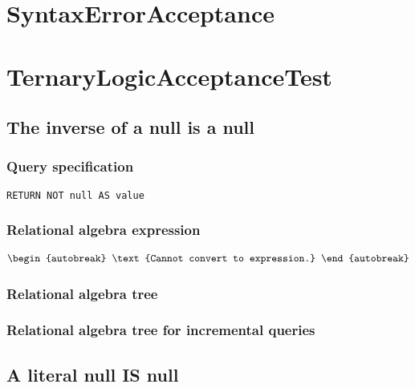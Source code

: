 \section{SyntaxErrorAcceptance}

\section{TernaryLogicAcceptanceTest}


\subsection{The inverse of a null is a null}

\subsubsection*{Query specification}

\begin{lstlisting}
RETURN NOT null AS value
\end{lstlisting}

\subsubsection*{Relational algebra expression}

\begin{align*}
\begin{autobreak}
\text{Cannot convert to expression.}
\end{autobreak}
\end{align*}

\subsubsection*{Relational algebra tree}


\subsubsection*{Relational algebra tree for incremental queries}


\subsection{A literal null IS null}


